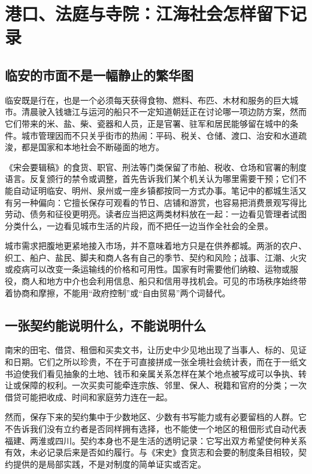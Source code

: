\section{港口、法庭与寺院：江海社会怎样留下记录}

\subsection{临安的市面不是一幅静止的繁华图}

临安既是行在，也是一个必须每天获得食物、燃料、布匹、木材和服务的巨大城市。清晨驶入钱塘江与运河的船只不一定知道朝廷正在讨论哪一项边防方案，然而它们带来的米、盐、柴、瓷器和人员，正是官署、驻军和居民能够留在城中的条件。城市管理因而不只关乎街市的热闹：平码、税关、仓储、渡口、治安和水道疏浚，都是国家和本地社会不断碰面的地方。

《宋会要辑稿》的食货、职官、刑法等门类保留了市舶、税收、仓场和官署的制度语言。反复颁行的禁令或调整，首先告诉我们某个机关认为哪里需要干预；它们不能自动证明临安、明州、泉州或一座乡镇都按同一方式办事。笔记中的都城生活又有另一种偏向：它擅长保存可观看的节日、店铺和游赏，也容易把消费景观写得比劳动、债务和征役更明亮。读者应当把这两类材料放在一起：一边看见管理者试图分类什么，一边看见城市生活的片段，而不把任一边当作全社会的全景。

城市需求把腹地更紧地接入市场，并不意味着地方只是在供养都城。两浙的农户、织工、船户、盐民、脚夫和商人各有自己的季节、契约和风险；战事、江潮、火灾或疫病可以改变一条运输线的价格和可用性。国家有时需要他们纳粮、运物或服役，商人和地方中介也会利用信息、船只和信用寻找机会。可见的市场秩序始终带着协商和摩擦，不能用“政府控制”或“自由贸易”两个词替代。

\subsection{一张契约能说明什么，不能说明什么}

南宋的田宅、借贷、租佃和买卖文书，让历史中少见地出现了当事人、标的、见证和日期。它们之所以珍贵，不在于可直接拼成一张全境社会统计表，而在于一纸文书迫使我们看见抽象的土地、钱币和亲属关系怎样在某个地点被写成可以争执、转让或保障的权利。一次买卖可能牵连宗族、邻里、保人、税籍和官府的分类；一次借贷可能把收成、时间和家庭劳力连在一起。

然而，保存下来的契约集中于少数地区、少数有书写能力或有必要留档的人群。它不告诉我们没有立约者是否同样拥有选择，也不能使一个地区的租佃形式自动代表福建、两淮或四川。契约本身也不是生活的透明记录：它写出双方希望使何种关系有效，未必记录后来是否如约履行。与《宋史》食货志和会要的制度条目相较，契约提供的是局部实践，不是对制度的简单证实或否定。

